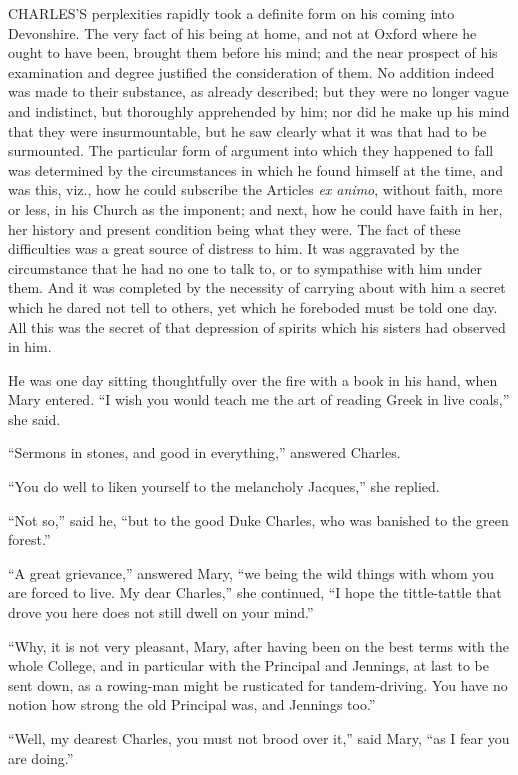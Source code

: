 CHARLES'S perplexities rapidly took a
definite form on his coming into Devonshire. The very fact of his
being at home, and not at Oxford where he ought to have been, brought
them before his mind; and the near prospect of his examination and
degree justified the consideration of them. No addition indeed was
made to their substance, as already described; but they were no longer
vague and indistinct, but thoroughly apprehended by him; nor did he
make up his mind that they were insurmountable, but he saw clearly
what it was that had to be surmounted. The particular form of argument
into which they happened to fall was determined by the circumstances
in which he found himself at the time, and was this, viz., how he
could subscribe the Articles \emph{ex animo}, without faith, more or
less, in his Church as the imponent; and next, how he could have faith
in her, her history and present condition being what they were. The
fact of these difficulties was a great source of distress to him. It
was aggravated by the circumstance that he had no one to talk to, or
to sympathise with him under them. And it was completed by the necessity of carrying about with him a secret which he dared not tell
to others, yet which he foreboded must be told one day. All this was
the secret of that depression of spirits which his sisters had
observed in him.

He was one day sitting thoughtfully over the fire with a book in
his hand, when Mary entered. ``I wish you would teach me the art
of reading Greek in live coals,'' she said.

``Sermons in stones, and good in everything,'' answered
Charles.

``You do well to liken yourself to the melancholy
Jacques,'' she replied.

``Not so,'' said he, ``but to the good Duke Charles,
who was banished to the green forest.''

``A great grievance,'' answered Mary, ``we being the
wild things with whom you are forced to live. My dear Charles,''
she continued, ``I hope the tittle-tattle that drove you here does
not still dwell on your mind.''

``Why, it is not very pleasant, Mary, after having been on the
best terms with the whole College, and in particular with the
Principal and Jennings, at last to be sent down, as a rowing-man might
be rusticated for tandem-driving. You have no notion how strong the
old Principal was, and Jennings too.''

``Well, my dearest Charles, you must not brood over it,''
said Mary, ``as I fear you are doing.''

